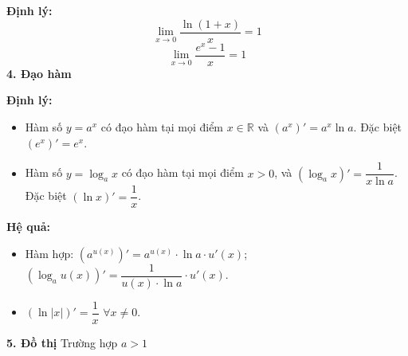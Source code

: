 \documentclass[12pt,a4paper]{extarticle}
\begin{document}
\noindent\textbf{Định lý:}
\[ \lim_{x \to 0} \frac{\ln(1 + x)}{x} = 1 \]
\[ \lim_{x \to 0} \frac{e^x - 1}{x} = 1 \]
\vspace{0.4cm}
\noindent\textbf{4. Đạo hàm}

\noindent\textbf{Định lý:}
\begin{itemize}
    \item[a)] Hàm số $y = a^x$ có đạo hàm tại mọi điểm $x \in \mathbb{R}$ và $(a^x)' = a^x \ln a$. Đặc biệt $(e^x)' = e^x$.
    \item[b)] Hàm số $y = \log_a x$ có đạo hàm tại mọi điểm $x > 0$, và $(\log_a x)' = \dfrac{1}{x \ln a}$. Đặc biệt $(\ln x)' = \dfrac{1}{x}$.
\end{itemize}
\noindent\textbf{Hệ quả:}
\begin{itemize}
    \item[a)] Hàm hợp: $\left(a^{u(x)}\right)' = a^{u(x)} \cdot \ln a \cdot u'(x)$; \quad $\left(\log_a u(x)\right)' = \dfrac{1}{u(x) \cdot \ln a} \cdot u'(x)$.
    \item[b)] $(\ln|x|)' = \dfrac{1}{x}$ \quad $\forall x \ne 0$.
\end{itemize}
\vspace{0.4cm}
\noindent\textbf{5. Đồ thị}
\noindent Trường hợp $a > 1$
\end{document}
